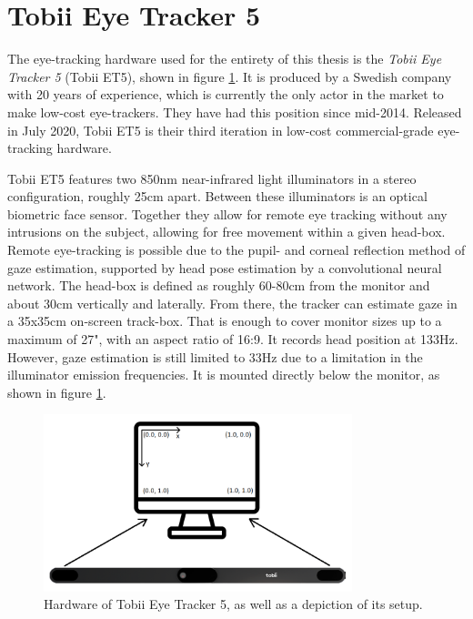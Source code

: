 \section{Tobii Eye Tracker 5} \label{sec:hwds_TobiiEyeTracker5}

The eye-tracking hardware used for the entirety of this thesis is the \textit{Tobii Eye Tracker 5} (Tobii ET5), shown in figure \ref{fig:hwds_hardware}. It is produced by a Swedish company with 20 years of experience, which is currently the only actor in the market to make low-cost eye-trackers. They have had this position since mid-2014. Released in July 2020, Tobii ET5 is their third iteration in low-cost commercial-grade eye-tracking hardware.

Tobii ET5 features two 850nm near-infrared light illuminators in a stereo configuration, roughly 25cm apart. Between these illuminators is an optical biometric face sensor. Together they allow for remote eye tracking without any intrusions on the subject, allowing for free movement within a given head-box. Remote eye-tracking is possible due to the pupil- and corneal reflection method of gaze estimation, supported by head pose estimation by a convolutional neural network. The head-box is defined as roughly 60-80cm from the monitor and about 30cm vertically and laterally. From there, the tracker can estimate gaze in a 35x35cm on-screen track-box. That is enough to cover monitor sizes up to a maximum of 27", with an aspect ratio of 16:9. It records head position at 133Hz. However, gaze estimation is still limited to 33Hz due to a limitation in the illuminator emission frequencies. It is mounted directly below the monitor, as shown in figure \ref{fig:hwds_hardware}.

\begin{figure}[h]
    \centering
    \includegraphics[width=0.8\textwidth]{Images/hwds_hardware.png}
    \caption{Hardware of Tobii Eye Tracker 5, as well as a depiction of its setup.}
    \label{fig:hwds_hardware}
\end{figure}

